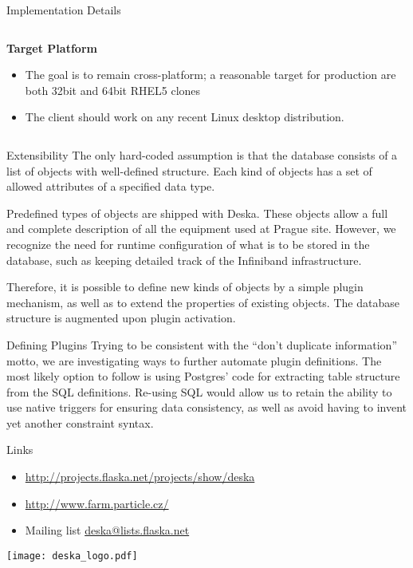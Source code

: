 \documentclass{beamer}
\newcommand{\Heading}[1]{\hskip1cm\textbf{#1}\\}
\begin{document}
\begin{frame}[fragile]
\begin{columns}[t]
\begin{column}{.48\linewidth}
\begin{block}{Implementation Details}
\begin{columns}[T]
\begin{column}{.6\linewidth}
\Heading{Target Platform}
\begin{itemize}
    \item The goal is to remain cross-platform; a reasonable target for
        production are both 32bit and 64bit RHEL5 clones
    \item The client should work on any recent Linux desktop distribution.
\end{itemize}
\end{column}
\end{columns}

\end{block}

\begin{block}{Extensibility}
The only \alert{hard-coded assumption} is that the database consists of a list
of objects with well-defined \alert{structure}.  Each kind of objects has a set
of allowed \alert{attributes} of a specified \alert{data type}.

Predefined types of objects are shipped with Deska.  These objects allow a
full and \alert{complete description} of all the equipment used at Prague site.
However, we recognize the need for \alert{runtime configuration} of what is to
be stored in the database, such as keeping detailed track of the Infiniband
infrastructure.

Therefore, it is possible to define new \alert{kinds} of objects by a simple
plugin mechanism, as well as to \alert{extend} the properties of existing
objects.  The database structure is augmented upon plugin activation.
\end{block}

\begin{block}{Defining Plugins}
Trying to be consistent with the ``don't duplicate information'' motto, we are
investigating ways to further \alert{automate} plugin definitions.  The most
likely option to follow is using Postgres' code for extracting table structure
from the \alert{SQL} definitions.  Re-using SQL would allow us to retain the
ability to use native triggers for ensuring \alert{data consistency}, as well as
avoid having to invent yet another constraint syntax.
\end{block}

\begin{block}{Links}
\begin{itemize}
    \item \url{http://projects.flaska.net/projects/show/deska}
    \item \url{http://www.farm.particle.cz/}
    \item Mailing list \url{deska@lists.flaska.net}
\end{itemize}
\texttt{[image: deska\_logo.pdf]}
\end{block}


\end{column}

\end{columns}
\vfill
\end{frame}
\end{document}

